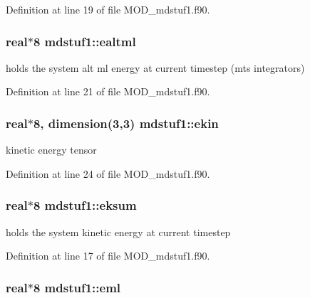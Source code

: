 Definition at line 19 of file M\-O\-D\-\_\-mdstuf1.\-f90.

\hypertarget{classmdstuf1_a1a70064e6eae90b20859e8432d8ae9d5}{
\subsubsection[{ealtml}]{\setlength{\rightskip}{0pt plus 5cm}real$\ast$8 mdstuf1\-::ealtml}}\label{classmdstuf1_a1a70064e6eae90b20859e8432d8ae9d5}


holds the system alt ml energy at current timestep (mts integrators) 



Definition at line 21 of file M\-O\-D\-\_\-mdstuf1.\-f90.

\hypertarget{classmdstuf1_aab46c7b16224602ecf8bf98020200d90}{
\subsubsection[{ekin}]{\setlength{\rightskip}{0pt plus 5cm}real$\ast$8, dimension(3,3) mdstuf1\-::ekin}}\label{classmdstuf1_aab46c7b16224602ecf8bf98020200d90}


kinetic energy tensor 



Definition at line 24 of file M\-O\-D\-\_\-mdstuf1.\-f90.

\hypertarget{classmdstuf1_a22e8389cd89cc777b27e371c623921eb}{
\subsubsection[{eksum}]{\setlength{\rightskip}{0pt plus 5cm}real$\ast$8 mdstuf1\-::eksum}}\label{classmdstuf1_a22e8389cd89cc777b27e371c623921eb}


holds the system kinetic energy at current timestep 



Definition at line 17 of file M\-O\-D\-\_\-mdstuf1.\-f90.

\hypertarget{classmdstuf1_a133be5118c4fa1b94112fe3edabc7490}{
\subsubsection[{eml}]{\setlength{\rightskip}{0pt plus 5cm}real$\ast$8 mdstuf1\-::eml}}\label{classmdstuf1_a133be5118c4fa1b94112fe3edabc7490}


